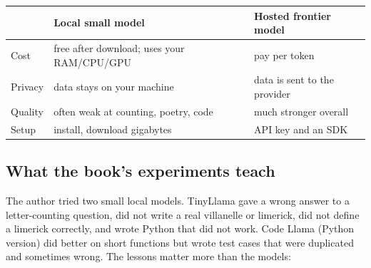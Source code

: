 \begin{center}
\end{center}

\begin{center}
\begin{tabularx}{\linewidth}{@{}l X X@{}}
\toprule
 & \textbf{Local small model} & \textbf{Hosted frontier model} \\
\midrule
Cost & free after download; uses your RAM/CPU/GPU & pay per token \\
Privacy & data stays on your machine & data is sent to the provider \\
Quality & often weak at counting, poetry, code & much stronger overall \\
Setup & install, download gigabytes & API key and an SDK \\
\bottomrule
\end{tabularx}
\end{center}

\subsection{What the book's experiments teach}

The author tried two small local models. TinyLlama gave a wrong answer to a letter-counting
question, did not write a real villanelle or limerick, did not define a limerick correctly, and wrote
Python that did not work. Code Llama (Python version) did better on short functions but wrote test
cases that were duplicated and sometimes wrong. The lessons matter more than the models:

